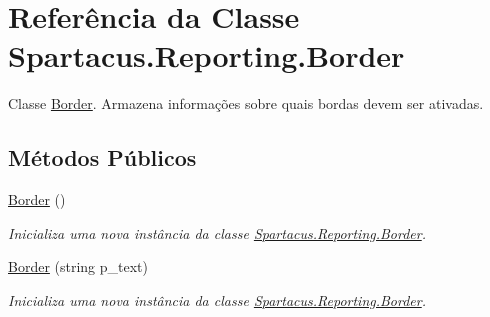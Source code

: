 \hypertarget{classSpartacus_1_1Reporting_1_1Border}{\section{Referência da Classe Spartacus.\+Reporting.\+Border}
\label{classSpartacus_1_1Reporting_1_1Border}
}


Classe \hyperlink{classSpartacus_1_1Reporting_1_1Border}{Border}. Armazena informações sobre quais bordas devem ser ativadas.  


\subsection*{Métodos Públicos}
\begin{DoxyCompactItemize}
\item 
\hyperlink{classSpartacus_1_1Reporting_1_1Border_a73158ce10d48332df0586e5f5e2e5c6b}{Border} ()
\begin{DoxyCompactList}\small\item\em Inicializa uma nova instância da classe \hyperlink{classSpartacus_1_1Reporting_1_1Border}{Spartacus.\+Reporting.\+Border}. \end{DoxyCompactList}\item 
\hyperlink{classSpartacus_1_1Reporting_1_1Border_adc6fdca5149668028eaa26be7d3e915f}{Border} (string p\+\_\+text)
\begin{DoxyCompactList}\small\item\em Inicializa uma nova instância da classe \hyperlink{classSpartacus_1_1Reporting_1_1Border}{Spartacus.\+Reporting.\+Border}. \end{DoxyCompactList}\end{DoxyCompactItemize}
